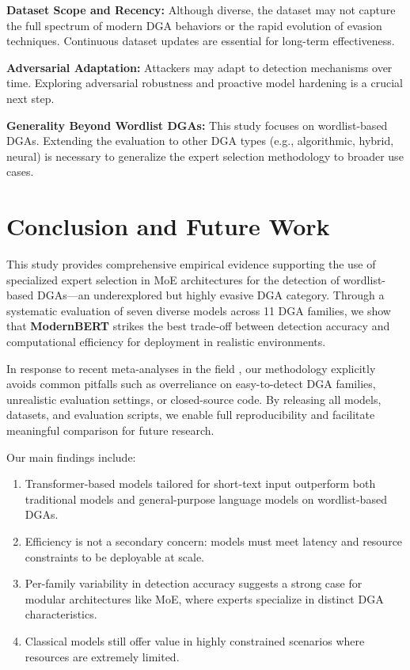 \documentclass[a4paper]{llncs}
\begin{document}
\textbf{Dataset Scope and Recency:} Although diverse, the dataset may not capture the full spectrum of modern DGA behaviors or the rapid evolution of evasion techniques. Continuous dataset updates are essential for long-term effectiveness.

\textbf{Adversarial Adaptation:} Attackers may adapt to detection mechanisms over time. Exploring adversarial robustness and proactive model hardening is a crucial next step.

\textbf{Generality Beyond Wordlist DGAs:} This study focuses on wordlist-based DGAs. Extending the evaluation to other DGA types (e.g., algorithmic, hybrid, neural) is necessary to generalize the expert selection methodology to broader use cases.


\section{Conclusion and Future Work}
\label{sec:conclusion}

This study provides comprehensive empirical evidence supporting the use of specialized expert selection in MoE architectures for the detection of wordlist-based DGAs—an underexplored but highly evasive DGA category. Through a systematic evaluation of seven diverse models across 11 DGA families, we show that \textbf{ModernBERT} strikes the best trade-off between detection accuracy and computational efficiency for deployment in realistic environments.

In response to recent meta-analyses in the field \cite{cebere2024down}, our methodology explicitly avoids common pitfalls such as overreliance on easy-to-detect DGA families, unrealistic evaluation settings, or closed-source code. By releasing all models, datasets, and evaluation scripts, we enable full reproducibility and facilitate meaningful comparison for future research.

Our main findings include:
\begin{enumerate}
    \item Transformer-based models tailored for short-text input outperform both traditional models and general-purpose language models on wordlist-based DGAs.
    \item Efficiency is not a secondary concern: models must meet latency and resource constraints to be deployable at scale.
    \item Per-family variability in detection accuracy suggests a strong case for modular architectures like MoE, where experts specialize in distinct DGA characteristics.
    \item Classical models still offer value in highly constrained scenarios where resources are extremely limited.
\end{enumerate}
\end{document}
